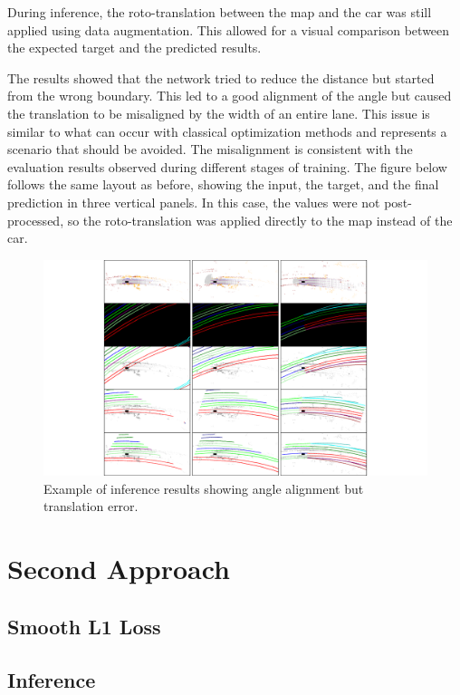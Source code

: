 During inference, the roto-translation between the map and the car was still applied using data augmentation. This allowed for a visual comparison between the expected target and the predicted results.

The results showed that the network tried to reduce the distance but started from the wrong boundary. This led to a good alignment of the angle but caused the translation to be misaligned by the width of an entire lane. This issue is similar to what can occur with classical optimization methods and represents a scenario that should be avoided. The misalignment is consistent with the evaluation results observed during different stages of training.
The figure below follows the same layout as before, showing the input, the target, and the final prediction in three vertical panels. In this case, the values were not post-processed, so the roto-translation was applied directly to the map instead of the car.

\begin{figure}[H]
    \centering
    \includegraphics[width=1\linewidth]{Untitled 2.pdf}
    \caption{Example of inference results showing angle alignment but translation error.}
    \label{fig:inference-results}
\end{figure}

\section{Second Approach}
\subsection*{Smooth L1 Loss}
\subsection{Inference}